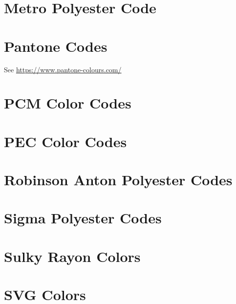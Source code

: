 \documentclass[a4paper]{report}
\begin{document}
%

\section{Metro Polyester Code}

%

\section{Pantone Codes}

See \url{https://www.pantone-colours.com/}

%

\section{PCM Color Codes}

%

\section{PEC Color Codes}

%

\section{Robinson Anton Polyester Codes}

% 

\section{Sigma Polyester Codes}

%

\section{Sulky Rayon Colors}

%

\section{SVG Colors}
\end{document}
